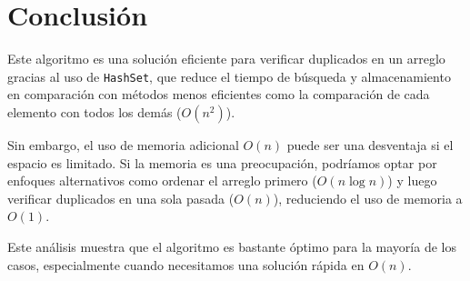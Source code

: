 \documentclass{article}
\begin{document}
	\section{Conclusión}
	Este algoritmo es una solución eficiente para verificar duplicados en un arreglo gracias al uso de \texttt{HashSet}, que reduce el tiempo de búsqueda y almacenamiento en comparación con métodos menos eficientes como la comparación de cada elemento con todos los demás ($O(n^2)$).
	
	Sin embargo, el uso de memoria adicional $O(n)$ puede ser una desventaja si el espacio es limitado. Si la memoria es una preocupación, podríamos optar por enfoques alternativos como ordenar el arreglo primero ($O(n \log n)$) y luego verificar duplicados en una sola pasada ($O(n)$), reduciendo el uso de memoria a $O(1)$.
	
	Este análisis muestra que el algoritmo es bastante óptimo para la mayoría de los casos, especialmente cuando necesitamos una solución rápida en $O(n)$.
	
	
	
	
	
	
	
\end{document}
